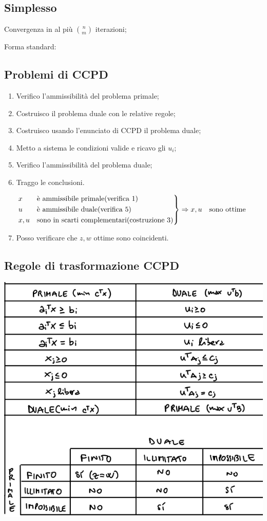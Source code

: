 \begin{multicols}{2}
\subsection*{Simplesso}
Convergenza in al più $\binom{n}{m}$ iterazioni;

Forma standard:



\subsection*{Problemi di CCPD}
\begin{enumerate}
    \item Verifico l'ammissibilità del problema primale;
    \item Costruisco il problema duale con le relative regole;
    \item Costruisco usando l'enunciato di CCPD il problema duale;
    \item Metto a sistema le condizioni valide e ricavo gli $u_i$;
    \item Verifico l'ammissibilità del problema duale;
    \item Traggo le conclusioni.
    
    \fontsize{6}{12}\selectfont
    $
    \begin{rcases}
    x & \textrm{è ammissibile primale(verifica 1)}\\
    u & \textrm{è ammissibile duale(verifica 5)}\\
    x,u & \textrm{sono in scarti complementari(costruzione 3)}
    \end{rcases} 
    \Rightarrow
    x,u \quad \textrm{sono ottime}      
    $
    \fontsize{8}{12}\selectfont

    \item Posso verificare che $z,w$ ottime sono coincidenti.
\end{enumerate}

\subsection*{Regole di trasformazione CCPD}
\includegraphics[width=0.9\linewidth]{img/trasformazioneCCPD.png}

\end{multicols}
